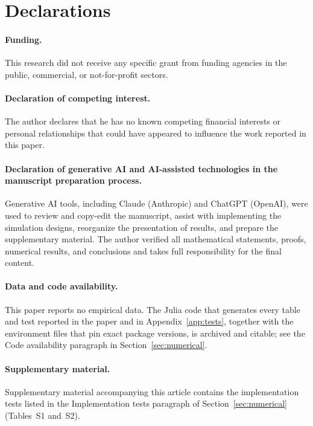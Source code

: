 \documentclass[12pt,english]{article}
\theoremstyle{plain} %
\theoremstyle{definition} %
\theoremstyle{remark} %
\newif\ifincludetests
\newcommand{\testslocation}{Appendix~\ref{app:tests}}
\newcommand{\testslocation}{the supplementary material}
\begin{document}
\fi

\FloatBarrier
\clearpage

\section*{Declarations}

\paragraph{Funding.}
This research did not receive any specific grant from funding agencies in the public, commercial, or not-for-profit sectors.

\paragraph{Declaration of competing interest.}
The author declares that he has no known competing financial interests or personal relationships that could have appeared to influence the work reported in this paper.

\paragraph{Declaration of generative AI and AI-assisted technologies in the manuscript preparation process.}
Generative AI tools, including Claude (Anthropic) and ChatGPT (OpenAI), were used to review and copy-edit the manuscript, assist with implementing the simulation designs, reorganize the presentation of results, and prepare the supplementary material. The author verified all mathematical statements, proofs, numerical results, and conclusions and takes full responsibility for the final content.

\paragraph{Data and code availability.}
This paper reports no empirical data. The Julia code that generates every table and test reported in the paper and in \testslocation, together with the environment files that pin exact package versions, is archived and citable; see the Code availability paragraph in Section~\ref{sec:numerical}.

\ifincludetests\else
\paragraph{Supplementary material.}
Supplementary material accompanying this article contains the implementation tests listed in the Implementation tests paragraph of Section~\ref{sec:numerical} (Tables~S1 and~S2).
\fi
\end{document}

